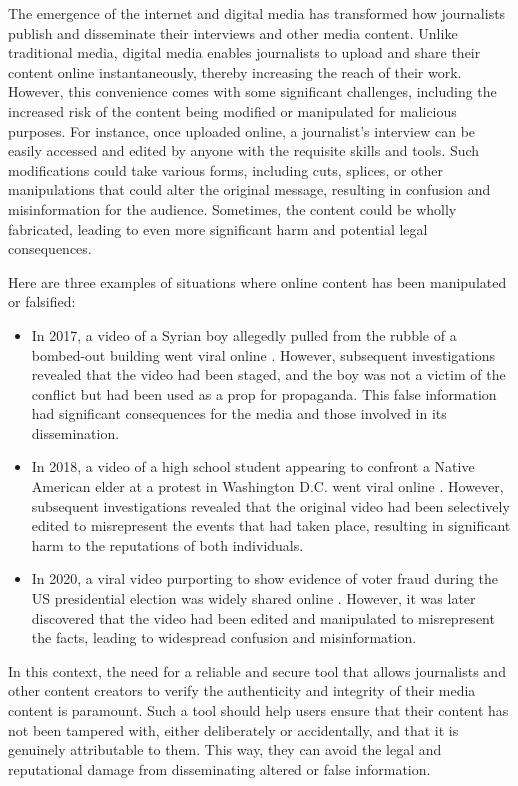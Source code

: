 \documentclass[target=mst,aauheader=]{thud}
\begin{document}
The emergence of the internet and digital media has transformed how journalists publish and disseminate their interviews and other media content. Unlike traditional media, digital media enables journalists to upload and share their content online instantaneously, thereby increasing the reach of their work. However, this convenience comes with some significant challenges, including the increased risk of the content being modified or manipulated for malicious purposes. For instance, once uploaded online, a journalist's interview can be easily accessed and edited by anyone with the requisite skills and tools. Such modifications could take various forms, including cuts, splices, or other manipulations that could alter the original message, resulting in confusion and misinformation for the audience. Sometimes, the content could be wholly fabricated, leading to even more significant harm and potential legal consequences.

Here are three examples of situations where online content has been manipulated or falsified:

\begin{itemize}

    \item In 2017, a video of a Syrian boy allegedly pulled from the rubble of a bombed-out building went viral online \cite{2017FakeVideo}. However, subsequent investigations revealed that the video had been staged, and the boy was not a victim of the conflict but had been used as a prop for propaganda. This false information had significant consequences for the media and those involved in its dissemination.
    \item In 2018, a video of a high school student appearing to confront a Native American elder at a protest in Washington D.C. went viral online \cite{2018fakeVideo}. However, subsequent investigations revealed that the original video had been selectively edited to misrepresent the events that had taken place, resulting in significant harm to the reputations of both individuals.
    \item In 2020, a viral video purporting to show evidence of voter fraud during the US presidential election was widely shared online \cite{2020fakeVideo}. However, it was later discovered that the video had been edited and manipulated to misrepresent the facts, leading to widespread confusion and misinformation.

\end{itemize}

In this context, the need for a reliable and secure tool that allows journalists and other content creators to verify the authenticity and integrity of their media content is paramount. Such a tool should help users ensure that their content has not been tampered with, either deliberately or accidentally, and that it is genuinely attributable to them. This way, they can avoid the legal and reputational damage from disseminating altered or false information.
\end{document}
